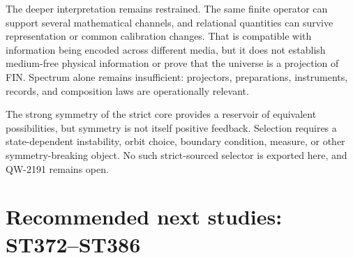 \documentclass[11pt,a4paper]{article}
\begin{document}
The deeper interpretation remains restrained. The same finite operator can support
several mathematical channels, and relational quantities can survive representation or
common calibration changes. That is compatible with information being encoded across
different media, but it does not establish medium-free physical information or prove that
the universe is a projection of FIN. Spectrum alone remains insufficient: projectors,
preparations, instruments, records, and composition laws are operationally relevant.

The strong symmetry of the strict core provides a reservoir of equivalent possibilities,
but symmetry is not itself positive feedback. Selection requires a state-dependent
instability, orbit choice, boundary condition, measure, or other symmetry-breaking object.
No such strict-sourced selector is exported here, and QW-2191 remains open.

\section{Recommended next studies: ST372--ST386}
\end{document}
